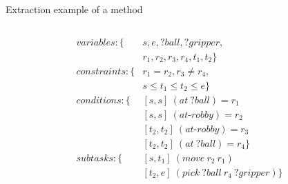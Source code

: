 \begin{frame}[c,fragile]{Extraction example of a method}
\begin{columns}[c, T]
\begin{column}{0.32\textwidth}
\tiny
\begin{align*}
    variables: \{&s,e,?ball,?gripper,\\
    &r_1,r_2,r_3,r_4,t_1,t_2\} \\
    constraints : \{ &r_1 = r_2, r_3 \neq r_4, \\
        & s \leq t_1 \leq t_2 \leq e \}\\
    conditions : \{&[s,s]~(at\ ?ball) = r_1 \\
        &[s,s]~(at\text{-}robby) = r_2 \\
        &[t_2,t_2]~(at\text{-}robby) = r_3 \\
        &[t_2,t_2]~(at\ ?ball) = r_4 \} \\
    subtasks : \{ &[s,t_1]~(move\ r_2\ r_1) \\
        &[t_2,e]~(pick\ ?ball\ r_4\ ?gripper)\}
\end{align*}  
        \end{column}
    \end{columns}
\end{frame}



